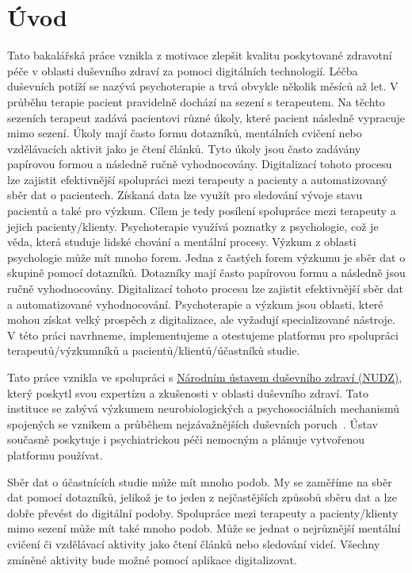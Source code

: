 \chapter*{Úvod}

Tato bakalářská práce vznikla z motivace zlepšit kvalitu poskytované zdravotní péče v oblasti duševního zdraví za pomoci digitálních technologií.
Léčba duševních potíží se nazývá psychoterapie a trvá obvykle několik měsíců až let.
V průběhu terapie pacient pravidelně dochází na sezení s terapeutem.
Na těchto sezeních terapeut zadává pacientovi různé úkoly, které pacient následně vypracuje mimo sezení.
Úkoly mají často formu dotazníků, mentálních cvičení nebo vzdělávacích aktivit jako je čtení článků.
Tyto úkoly jsou často zadávány papírovou formou a následně ručně vyhodnocovány.
Digitalizací tohoto procesu lze zajistit efektivnější spolupráci mezi terapeuty a pacienty a automatizovaný sběr dat o pacientech.
Získaná data lze využít pro sledování vývoje stavu pacientů a také pro výzkum.
Cílem je tedy posílení spolupráce mezi terapeuty a jejich pacienty/klienty.
Psychoterapie využívá poznatky z psychologie, což je věda, která studuje lidské chování a mentální procesy.
Výzkum z oblasti psychologie může mít mnoho forem.
Jedna z častých forem výzkumu je sběr dat o skupině pomocí dotazníků.
Dotazníky mají často papírovou formu a následně jsou ručně vyhodnocovány.
Digitalizací tohoto procesu lze zajistit efektivnější sběr dat a automatizované vyhodnocování.
Psychoterapie a výzkum jsou oblasti, které mohou získat velký prospěch z digitalizace, ale vyžadují specializované nástroje.
V této práci navrhneme, implementujeme a otestujeme platformu pro spolupráci terapeutů/výzkumníků a pacientů/klientů/účastníků studie.

Tato práce vznikla ve spolupráci s \href{https://www.nudz.cz/}{Národním ústavem duševního zdraví (NUDZ)}, který poskytl svou expertízu a zkušenosti v oblasti duševního zdraví.
Tato instituce se zabývá výzkumem neurobiologických a psychosociálních mechanismů spojených se vznikem a průběhem nejzávažnějších duševních poruch~\cite{nudz-profil}.
Ústav současně poskytuje i psychiatrickou péči nemocným a plánuje vytvořenou platformu používat.

Sběr dat o účastnících studie může mít mnoho podob.
My se zaměříme na sběr dat pomocí dotazníků, jelikož je to jeden z nejčastějších způsobů sběru dat a lze dobře převést do digitální podoby.
Spolupráce mezi terapeuty a pacienty/klienty mimo sezení může mít také mnoho podob.
Může se jednat o nejrůznější mentální cvičení či vzdělávací aktivity jako čtení článků nebo sledování videí.
Všechny zmíněné aktivity bude možné pomocí aplikace digitalizovat.

